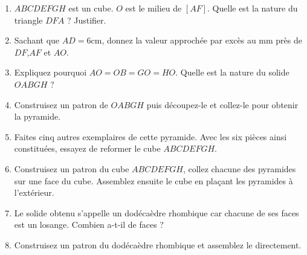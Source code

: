 \documentclass[a4paper,10pt]{report}
\begin{document}
\begin{ex}

\medskip
\noindent \begin{minipage}{5.5cm}
\begin{center}
\end{center}
\end{minipage}
\begin{minipage}{11cm}
\begin{enumerate}[font=\color{exer3}]
\item $ABCDEFGH$ est un cube. $O$ est le milieu de $[AF]$.
Quelle est la nature du triangle $DFA$ ? Justifier.
\item Sachant que $AD=6$cm, donnez la valeur approchée par excès au mm près de $DF$,$ AF$ et $AO$.
\item Expliquez pourquoi $AO=OB=GO=HO$. Quelle est la nature du solide $OABGH$ ?
\item Construisez un patron de $OABGH$ puis découpez-le et collez-le pour obtenir la pyramide.
\item Faites cinq autres exemplaires de cette pyramide. Avec les six pièces ainsi constituées, essayez de reformer le cube $ABCDEFGH$.
\end{enumerate}
\end{minipage}

\begin{enumerate}[font=\color{exer3}]
\setcounter{enumi}{5}
\item Construisez un patron du cube $ABCDEFGH$, collez chacune des pyramides sur une face du cube. Assemblez ensuite le cube en plaçant les pyramides à l'extérieur.
\item Le solide obtenu s'appelle un dodécaèdre rhombique car chacune de ses faces est un losange. Combien a-t-il de faces ?
\item Construisez un patron du dodécaèdre rhombique et assemblez le directement.
\end{enumerate}
\end{ex}
\end{document}
